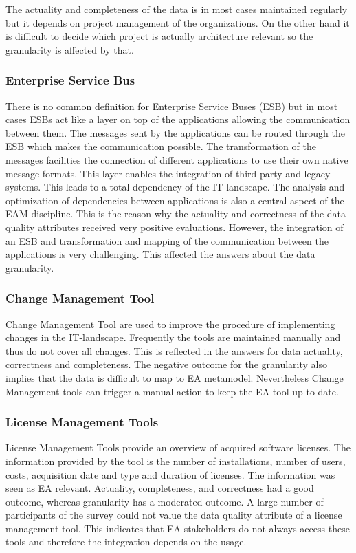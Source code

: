 The actuality and completeness of the data is in most cases maintained regularly but it depends on project management of the organizations. On the other hand it is difficult to decide which project is actually architecture relevant so the granularity is affected by that.

\subsubsection{Enterprise Service Bus}
There is no common definition for Enterprise Service Buses (ESB) but in most cases ESBs act like a layer on top of the applications allowing the communication between them. The messages sent by the applications can be routed through the ESB which makes the communication possible. The transformation of the messages facilities the connection of different applications to use their own native message formats. This layer enables the integration of third party and legacy
systems. This leads to a total dependency of the IT landscape. \cite{Menge2007}
The analysis and optimization of dependencies between applications is also a central aspect of the EAM discipline. This is the reason why the actuality and correctness of the data quality attributes received very positive evaluations. However, the integration of an ESB and transformation and mapping of the communication between the applications is very challenging. This affected the answers about the data granularity. \cite{Farwick2013}

\subsubsection{Change Management Tool}
Change Management Tool are used to improve the procedure of implementing changes in the
IT-landscape. Frequently the tools are maintained manually and thus do not cover all changes. This is reflected in the answers for data actuality, correctness and completeness. The negative
outcome for the granularity also implies that the data is difficult to map to EA metamodel.
Nevertheless Change Management tools can trigger a manual action to keep the EA tool up-to-date.

\subsubsection{License Management Tools}
License Management Tools provide an overview of acquired software licenses. The information provided by the tool is the number of installations, number of users, costs, acquisition date and type and duration of licenses. The information was seen as EA relevant. Actuality, completeness, and correctness had a good outcome, whereas granularity has a moderated outcome. A large number of participants of the survey could not value the data quality attribute of a license management tool. This indicates that EA stakeholders do not always access these tools and therefore the integration depends on the usage.

